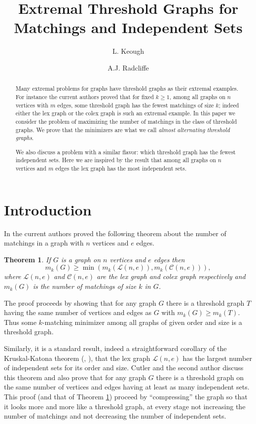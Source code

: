 \documentclass[12pt]{amsart}
\title{Extremal Threshold Graphs for Matchings and Independent Sets}
\author{L. Keough}
\author{A.J. Radcliffe}
\theoremstyle{plain}
\newtheorem{thm}{Theorem}[section]
\theoremstyle{definition}
\newcommand{\cL}{\mathcal{L}}
\newcommand{\cC}{\mathcal{C}}
\begin{document}
\maketitle

\begin{abstract}
    Many extremal problems for graphs have threshold graphs as their extremal examples. For instance the current authors proved that for fixed $k\ge 1$, among all graphs on $n$ vertices with $m$ edges, some threshold graph has the fewest matchings of size $k$; indeed either the lex graph or the colex graph is such an extremal example. In this paper we consider the problem of maximizing the number of matchings in the class of threshold graphs. We prove that the minimizers are what we call \emph{almost alternating threshold graphs}.

We also discuss a problem with a similar flavor: which threshold graph has the fewest independent sets. Here we are inspired by the result that among all graphs on $n$ vertices and $m$ edges the lex graph has the most independent sets.
\end{abstract}

\section{Introduction} %
\label{sec:introduction}

In \cite{Matchings} the current authors proved the following theorem about the number of matchings in a graph with $n$ vertices and $e$ edges. 

\begin{thm}\label{thm:KR}
	If $G$ is a graph on $n$ vertices and $e$ edges then 
	\[
		m_k(G) \ge \min( m_k(\cL(n,e)), m_k(\cC(n,e))),
	\]
	where $\cL(n,e)$ and $\cC(n,e)$ are the lex graph and colex graph respectively and $m_k(G)$ is the number of matchings of size $k$ in $G$.
\end{thm}

The proof proceeds by showing that for any graph $G$ there is a threshold graph $T$ having the same number of vertices and edges as $G$ with $m_k(G)\ge m_k(T)$. Thus some $k$-matching minimizer among all graphs of given order and size is a threshold graph. 

Similarly, it is a  standard result, indeed a straightforward corollary of the Kruskal-Katona theorem (\cite{Kruskal}, \cite{Katona}), that the lex graph $\cL(n,e)$ has the largest number of independent sets for its order and size. Cutler and the second author \cite{CR} discuss this theorem and also prove that for any graph $G$ there is a threshold graph on the same number of vertices and edges having at least as many independent sets. This proof (and that of Theorem \ref{thm:KR}) proceed by ``compressing'' the graph so that it looks more and more like a threshold graph, at every stage not increasing the number of matchings and not decreasing the number of independent sets. 
\end{document}
